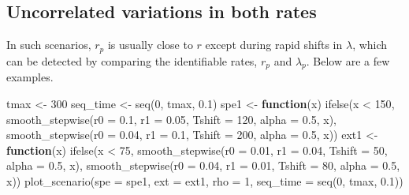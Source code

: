 \documentclass[
]{article}
\newenvironment{Shaded}{\begin{snugshade}}{\end{snugshade}}
\newcommand{\AttributeTok}[1]{\textcolor[rgb]{0.77,0.63,0.00}{#1}}
\newcommand{\ControlFlowTok}[1]{\textcolor[rgb]{0.13,0.29,0.53}{\textbf{#1}}}
\newcommand{\DecValTok}[1]{\textcolor[rgb]{0.00,0.00,0.81}{#1}}
\newcommand{\FloatTok}[1]{\textcolor[rgb]{0.00,0.00,0.81}{#1}}
\newcommand{\FunctionTok}[1]{\textcolor[rgb]{0.00,0.00,0.00}{#1}}
\newcommand{\NormalTok}[1]{#1}
\newcommand{\OtherTok}[1]{\textcolor[rgb]{0.56,0.35,0.01}{#1}}
\newcommand{\SpecialCharTok}[1]{\textcolor[rgb]{0.00,0.00,0.00}{#1}}
\begin{document}
\pagebreak

\hypertarget{uncorrelated-variations-in-both-rates}{%
\subsection{Uncorrelated variations in both
rates}\label{uncorrelated-variations-in-both-rates}}

In such scenarios, \(r_p\) is usually close to \(r\) except during rapid
shifts in \(\lambda\), which can be detected by comparing the
identifiable rates, \(r_p\) and \(\lambda_p\). Below are a few examples.

\begin{Shaded}
\begin{Highlighting}[]
\NormalTok{tmax }\OtherTok{\textless{}{-}} \DecValTok{300}
\NormalTok{seq\_time }\OtherTok{\textless{}{-}} \FunctionTok{seq}\NormalTok{(}\DecValTok{0}\NormalTok{, tmax, }\FloatTok{0.1}\NormalTok{)}
\NormalTok{spe1 }\OtherTok{\textless{}{-}} \ControlFlowTok{function}\NormalTok{(x) }\FunctionTok{ifelse}\NormalTok{(x }\SpecialCharTok{\textless{}} \DecValTok{150}\NormalTok{, }\FunctionTok{smooth\_stepwise}\NormalTok{(}\AttributeTok{r0 =} \FloatTok{0.1}\NormalTok{,}
    \AttributeTok{r1 =} \FloatTok{0.05}\NormalTok{, }\AttributeTok{Tshift =} \DecValTok{120}\NormalTok{, }\AttributeTok{alpha =} \FloatTok{0.5}\NormalTok{, x), }\FunctionTok{smooth\_stepwise}\NormalTok{(}\AttributeTok{r0 =} \FloatTok{0.04}\NormalTok{,}
    \AttributeTok{r1 =} \FloatTok{0.1}\NormalTok{, }\AttributeTok{Tshift =} \DecValTok{200}\NormalTok{, }\AttributeTok{alpha =} \FloatTok{0.5}\NormalTok{, x))}
\NormalTok{ext1 }\OtherTok{\textless{}{-}} \ControlFlowTok{function}\NormalTok{(x) }\FunctionTok{ifelse}\NormalTok{(x }\SpecialCharTok{\textless{}} \DecValTok{75}\NormalTok{, }\FunctionTok{smooth\_stepwise}\NormalTok{(}\AttributeTok{r0 =} \FloatTok{0.01}\NormalTok{,}
    \AttributeTok{r1 =} \FloatTok{0.04}\NormalTok{, }\AttributeTok{Tshift =} \DecValTok{50}\NormalTok{, }\AttributeTok{alpha =} \FloatTok{0.5}\NormalTok{, x), }\FunctionTok{smooth\_stepwise}\NormalTok{(}\AttributeTok{r0 =} \FloatTok{0.04}\NormalTok{,}
    \AttributeTok{r1 =} \FloatTok{0.01}\NormalTok{, }\AttributeTok{Tshift =} \DecValTok{80}\NormalTok{, }\AttributeTok{alpha =} \FloatTok{0.5}\NormalTok{, x))}
\FunctionTok{plot\_scenario}\NormalTok{(}\AttributeTok{spe =}\NormalTok{ spe1, }\AttributeTok{ext =}\NormalTok{ ext1, }\AttributeTok{rho =} \DecValTok{1}\NormalTok{, }\AttributeTok{seq\_time =} \FunctionTok{seq}\NormalTok{(}\DecValTok{0}\NormalTok{,}
\NormalTok{    tmax, }\FloatTok{0.1}\NormalTok{))}
\end{Highlighting}
\end{Shaded}
\end{document}
